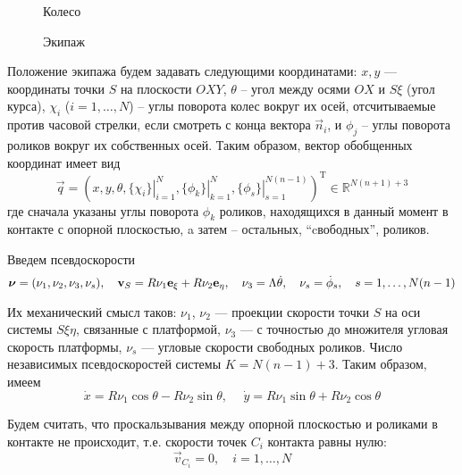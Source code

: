 \begin{figure}[h]
        \centering
        \caption{Колесо}
        \label{fig:wheel}
    \endminipage
        \centering
        \caption{Экипаж}
        \label{fig:vehicle}
    \endminipage
\end{figure}

Положение экипажа будем задавать следующими координатами:
$x, y$ --- координаты точки $S$ на плоскости $OXY$, $\theta$ -- угол между осями $OX$ и $S\xi$ (угол курса),
$\chi_i$ ($i = 1,\dots,N$) -- углы поворота колес вокруг их осей, отсчитываемые против часовой стрелки, если смотреть с конца вектора $\vec{n}_i$, и $\phi_j$ -- углы поворота роликов вокруг их собственных осей.
Таким образом, вектор обобщенных координат имеет вид
$$\vec{q} = (
    x, y, \theta,
    \left.\{\chi_i\}\right|_{i=1}^N ,
    \left.\{\phi_k\}\right|_{k=1}^N,
    \left.\{\phi_s\}\right|_{s=1}^{N(n - 1)}
)^{\mathop{T}}\in\mathbb{R}^{N(n+1) + 3}$$ 
где сначала указаны углы поворота $\phi_k$ роликов, находящихся в данный момент в контакте с опорной плоскостью, a затем -- остальных, ``cвободных'', роликов.

Введем псевдоскорости
$$\boldsymbol{\mathbf{\nu}} = (\nu_1, \nu_2, \nu_3, \nu_s), \quad \boldsymbol{\mathbf{v}}_S = R\nu_1\boldsymbol{\mathbf{e}}_\xi + R\nu_2\boldsymbol{\mathbf{e}}_\eta, \quad \nu_3 = \Lambda\dot{\theta},\quad \nu_s = \dot{\phi}_s, \quad s = 1,\ldots,N(n-1)$$

Их механический смысл таков: $\nu_1$, $\nu_2$ --- проекции скорости точки $S$ на оси системы $S\xi\eta$, связанные с платформой, $\nu_3$ --- с точностью до множителя угловая скорость платформы, $\nu_s$ --- угловые скорости свободных роликов. Число независимых псевдоскоростей системы $K = N(n-1)+3$. Таким образом, имеем
$$ \dot{x} = R \nu_1\cos\theta-R\nu_2\sin\theta, \hspace{15pt} \dot{y} = R\nu_1\sin\theta+R\nu_2\cos\theta$$

Будем считать, что проскальзывания между опорной плоскостью и роликами в контакте не происходит, т.е.
скорости точек $C_i$ контакта равны нулю:
\begin{equation}\label{eq:constraints_vec}
    \vec{v}_{C_i} = 0,\quad i = 1,\dots, N    
\end{equation}


